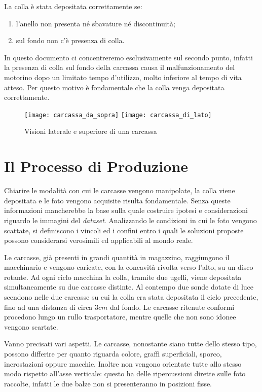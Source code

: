 La colla è stata depositata correttamente se:
\begin{enumerate}
  \item l'anello non presenta né sbavature né discontinuità;
  \item sul fondo non c'è presenza di colla.
\end{enumerate}
In questo documento ci concentreremo esclusivamente sul secondo punto, infatti la presenza di colla sul fondo della carcassa causa il malfunzionamento del motorino dopo un limitato tempo d'utilizzo, molto inferiore al tempo di vita atteso.
Per questo motivo è fondamentale che la colla venga depositata correttamente.

\begin{figure}[h]
  \texttt{[image: carcassa\_da\_sopra]}
  \texttt{[image: carcassa\_di\_lato]}
  \caption{Visioni laterale e superiore di una carcassa}
  \label{fig:carc}
\end{figure}

\clearpage

\section{Il Processo di Produzione}
Chiarire le modalità con cui le carcasse vengono manipolate, la colla viene depositata e le foto vengono acquisite risulta fondamentale.
Senza queste informazioni mancherebbe la base sulla quale costruire ipotesi e considerazioni riguardo le immagini del \textit{dataset}.
Analizzando le condizioni in cui le foto vengono scattate, si definiscono i vincoli ed i confini entro i quali le soluzioni proposte possono considerarsi verosimili ed applicabili al mondo reale.

Le carcasse, già presenti in grandi quantità in magazzino, raggiungono il macchinario e vengono caricate, con la concavità rivolta verso l'alto, su un disco rotante.
Ad ogni ciclo macchina la colla, tramite due ugelli, viene depositata simultaneamente su due carcasse distinte.
Al contempo due sonde dotate di luce scendono nelle due carcasse su cui la colla era stata depositata il ciclo precedente, fino ad una distanza di circa $3cm$ dal fondo.
Le carcasse ritenute conformi procedono lungo un rullo trasportatore, mentre quelle che non sono idonee vengono scartate.

Vanno precisati vari aspetti.
Le carcasse, nonostante siano tutte dello stesso tipo, possono differire per quanto riguarda colore, graffi superficiali, sporco, incrostazioni oppure macchie.
Inoltre non vengono orientate tutte allo stesso modo rispetto all'asse verticale: questo ha delle ripercussioni dirette sulle foto raccolte, infatti le due balze non si presenteranno in posizioni fisse.

